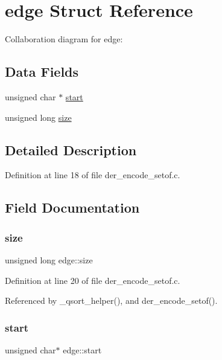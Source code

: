 \hypertarget{structedge}{}\section{edge Struct Reference}
\label{structedge}


Collaboration diagram for edge\+:
\subsection*{Data Fields}
\begin{DoxyCompactItemize}
\item 
unsigned char $\ast$ \mbox{\hyperlink{structedge_ac8d50f8cbdc126000b0836cacfa19d73}{start}}
\item 
unsigned long \mbox{\hyperlink{structedge_a64bdc14a16193c014f1ef50be358441d}{size}}
\end{DoxyCompactItemize}


\subsection{Detailed Description}


Definition at line 18 of file der\+\_\+encode\+\_\+setof.\+c.



\subsection{Field Documentation}
\mbox{\label{structedge_a64bdc14a16193c014f1ef50be358441d}} 
\subsubsection{\texorpdfstring{size}{size}}
{\footnotesize\ttfamily unsigned long edge\+::size}



Definition at line 20 of file der\+\_\+encode\+\_\+setof.\+c.



Referenced by \+\_\+qsort\+\_\+helper(), and der\+\_\+encode\+\_\+setof().

\mbox{\label{structedge_ac8d50f8cbdc126000b0836cacfa19d73}} 
\subsubsection{\texorpdfstring{start}{start}}
{\footnotesize\ttfamily unsigned char$\ast$ edge\+::start}



